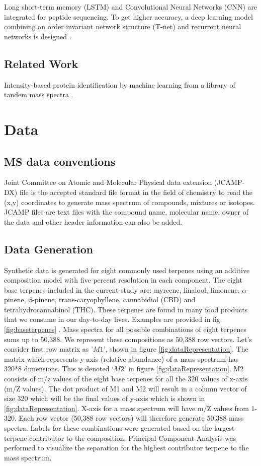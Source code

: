 \documentclass[12pt, a4paper]{article}
\begin{document}
Long short-term memory (LSTM) and Convolutional Neural Networks (CNN) are integrated for peptide sequencing. To get higher accuracy, a deep learning model combining an order invariant network structure (T-net) and recurrent neural networks is designed \cite{Bhermann2017}.

\subsection{Related Work}
Intensity-based protein identification by machine learning from a library of tandem mass spectra \cite{Elias2004}.


\section{Data}
\subsection{MS data conventions}
Joint Committee on Atomic and Molecular Physical data extension (JCAMP-DX) file is the accepted standard file format in the field of chemistry to read the (x,y) coordinates to generate mass spectrum of compounds, mixtures or isotopes. JCAMP files are text files with the compound name, molecular name, owner of the data and other header information can also be added.

\subsection{Data Generation}
Synthetic data is generated for eight commonly used terpenes using an additive composition model with five percent resolution in each component. The eight base terpenes included in the current study are: myrcene, linalool, limonene, $\alpha$-pinene, $\beta$-pinene, trans-caryophyllene, cannabidiol (CBD) and tetrahydrocannabinol (THC). These terpenes are found in many food products that we consume in our day-to-day lives.  Examples are provided in fig. \ref{fig:baseterpenes} \cite{Russo2011}. Mass spectra for all possible combinations of eight terpenes sums up to 50,388. We represent these compositions as 50,388 row vectors. Let's consider first row matrix as '$M1$', shown in figure \ref{fig:dataRepresentation}. The matrix which represents y-axis (relative abundance) of a mass spectrum has 320*8 dimensions. This is denoted `$M2$' in figure \ref{fig:dataRepresentation}. M2 consists of m/z values of the eight base terpenes for all the 320 values of x-axis (m/Z values). The dot product of M1 and M2 will result in a column vector of size 320 which will be the final values of y-axis which is shown in \ref{fig:dataRepresentation}. X-axis for a mass spectrum will have m/Z values from 1-320. Each row vector (50,388 row vectors) will therefore generate 50,388 mass spectra. Labels for these combinations were generated based on the largest terpene contributor to the composition. Principal Component Analysis was performed to visualize the separation for the highest contributor terpene to the mass spectrum. %
\end{document}
